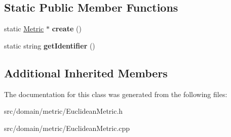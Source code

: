 \subsection*{Static Public Member Functions}
\begin{DoxyCompactItemize}
\item 
\hypertarget{class_euclidean_metric_a071547839c764daa6ccbfea7e5b90f67}{}static \hyperlink{class_metric}{Metric} $\ast$ {\bfseries create} ()\label{class_euclidean_metric_a071547839c764daa6ccbfea7e5b90f67}

\item 
\hypertarget{class_euclidean_metric_aae3729a99847724320e0f969d5af85e7}{}static string {\bfseries get\+Identifier} ()\label{class_euclidean_metric_aae3729a99847724320e0f969d5af85e7}

\end{DoxyCompactItemize}
\subsection*{Additional Inherited Members}


The documentation for this class was generated from the following files\+:\begin{DoxyCompactItemize}
\item 
src/domain/metric/Euclidean\+Metric.\+h\item 
src/domain/metric/Euclidean\+Metric.\+cpp\end{DoxyCompactItemize}
